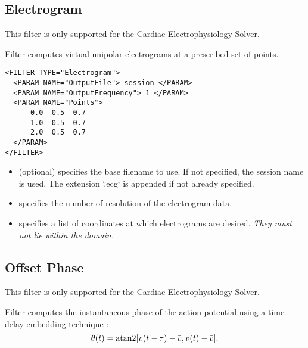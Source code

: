 \subsection{Electrogram}\label{filters:Electrogram}

\begin{notebox}
  This filter is only supported for the Cardiac Electrophysiology Solver.
\end{notebox}

Filter  computes virtual unipolar electrograms at a
     prescribed set of points.
\begin{lstlisting}[style=XmlStyle]
<FILTER TYPE="Electrogram">
  <PARAM NAME="OutputFile"> session </PARAM>
  <PARAM NAME="OutputFrequency"> 1 </PARAM>
  <PARAM NAME="Points">
      0.0  0.5  0.7
      1.0  0.5  0.7
      2.0  0.5  0.7
  </PARAM>
</FILTER>
\end{lstlisting}
    \begin{itemize}
    \item {} (optional) specifies the base filename to use. If
    not specified, the session name is used. The extension `.ecg` is appended if not already specified.
    \item {} specifies the number of resolution of the
    electrogram data.
    \item {} specifies a list of coordinates at which electrograms
    are desired. \emph{They must not lie within the domain.}
    \end{itemize}

\subsection{Offset Phase}\label{filters:OffsetPhase}

\begin{notebox}
  This filter is only supported for the Cardiac Electrophysiology Solver.
\end{notebox}

Filter  computes the instantaneous phase of the action potential using a time delay-embedding technique \cite{iyer2001}:\\
\begin{equation*}
	\theta(t) = \textnormal{atan2}[v(t-\tau)-\bar v, v(t) - \bar v].
\end{equation*}

